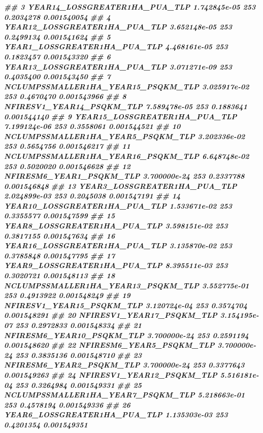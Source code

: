 \documentclass[10pt,landscape,a3paper]{article}
\newenvironment{Shaded}{\begin{snugshade}}{\end{snugshade}}
\newcommand{\DocumentationTok}[1]{\textcolor[rgb]{0.56,0.35,0.01}{\textbf{\textit{#1}}}}
\begin{document}
\begin{Shaded}
\begin{Highlighting}[]
\DocumentationTok{\#\# 3       YEAR14\_LOSSGREATER1HA\_PUA\_TLP 1.742845e{-}05    253 0.2034278 0.001540054}
\DocumentationTok{\#\# 4       YEAR12\_LOSSGREATER1HA\_PUA\_TLP 3.652148e{-}05    253 0.2499134 0.001541624}
\DocumentationTok{\#\# 5        YEAR1\_LOSSGREATER1HA\_PUA\_TLP 4.468161e{-}05    253 0.1823457 0.001543320}
\DocumentationTok{\#\# 6       YEAR13\_LOSSGREATER1HA\_PUA\_TLP 3.071271e{-}09    253 0.4035400 0.001543450}
\DocumentationTok{\#\# 7  NCLUMPSSMALLER1HA\_YEAR15\_PSQKM\_TLP 3.025917e{-}02    253 0.4670470 0.001543966}
\DocumentationTok{\#\# 8           NFIRESV1\_YEAR14\_PSQKM\_TLP 7.589478e{-}05    253 0.1883641 0.001544140}
\DocumentationTok{\#\# 9       YEAR15\_LOSSGREATER1HA\_PUA\_TLP 7.199124e{-}06    253 0.3558061 0.001544521}
\DocumentationTok{\#\# 10  NCLUMPSSMALLER1HA\_YEAR5\_PSQKM\_TLP 3.202336e{-}02    253 0.5654756 0.001546217}
\DocumentationTok{\#\# 11 NCLUMPSSMALLER1HA\_YEAR16\_PSQKM\_TLP 6.648748e{-}02    253 0.5020020 0.001546628}
\DocumentationTok{\#\# 12           NFIRESM6\_YEAR1\_PSQKM\_TLP 3.700000e{-}24    253 0.2337788 0.001546848}
\DocumentationTok{\#\# 13       YEAR3\_LOSSGREATER1HA\_PUA\_TLP 2.024899e{-}03    253 0.2045038 0.001547191}
\DocumentationTok{\#\# 14      YEAR10\_LOSSGREATER1HA\_PUA\_TLP 1.533671e{-}02    253 0.3355577 0.001547599}
\DocumentationTok{\#\# 15       YEAR8\_LOSSGREATER1HA\_PUA\_TLP 3.598151e{-}02    253 0.3817155 0.001547634}
\DocumentationTok{\#\# 16      YEAR16\_LOSSGREATER1HA\_PUA\_TLP 3.135870e{-}02    253 0.3785848 0.001547795}
\DocumentationTok{\#\# 17       YEAR9\_LOSSGREATER1HA\_PUA\_TLP 8.395511e{-}03    253 0.3020721 0.001548113}
\DocumentationTok{\#\# 18 NCLUMPSSMALLER1HA\_YEAR13\_PSQKM\_TLP 3.552775e{-}01    253 0.4913922 0.001548249}
\DocumentationTok{\#\# 19          NFIRESV1\_YEAR15\_PSQKM\_TLP 3.120724e{-}04    253 0.3574704 0.001548291}
\DocumentationTok{\#\# 20          NFIRESV1\_YEAR17\_PSQKM\_TLP 3.154195e{-}07    253 0.2972833 0.001548334}
\DocumentationTok{\#\# 21          NFIRESM6\_YEAR10\_PSQKM\_TLP 3.700000e{-}24    253 0.2591194 0.001548620}
\DocumentationTok{\#\# 22           NFIRESM6\_YEAR5\_PSQKM\_TLP 3.700000e{-}24    253 0.3835136 0.001548710}
\DocumentationTok{\#\# 23           NFIRESM6\_YEAR2\_PSQKM\_TLP 3.700000e{-}24    253 0.3377643 0.001549263}
\DocumentationTok{\#\# 24          NFIRESV1\_YEAR12\_PSQKM\_TLP 5.516181e{-}04    253 0.3264984 0.001549331}
\DocumentationTok{\#\# 25  NCLUMPSSMALLER1HA\_YEAR7\_PSQKM\_TLP 5.218663e{-}01    253 0.4578194 0.001549336}
\DocumentationTok{\#\# 26       YEAR6\_LOSSGREATER1HA\_PUA\_TLP 1.135303e{-}03    253 0.4201354 0.001549351}

\end{Highlighting}
\end{Shaded}
\end{document}
